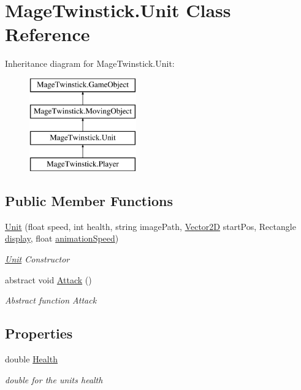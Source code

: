 \hypertarget{class_mage_twinstick_1_1_unit}{}\section{Mage\+Twinstick.\+Unit Class Reference}
\label{class_mage_twinstick_1_1_unit}
Inheritance diagram for Mage\+Twinstick.\+Unit\+:\begin{figure}[H]
\begin{center}
\leavevmode
\includegraphics[height=4.000000cm]{class_mage_twinstick_1_1_unit}
\end{center}
\end{figure}
\subsection*{Public Member Functions}
\begin{DoxyCompactItemize}
\item 
\hyperlink{class_mage_twinstick_1_1_unit_a857d0f6e0f55b4c81e2a3bbf8711dd18}{Unit} (float speed, int health, string image\+Path, \hyperlink{class_mage_twinstick_1_1_vector2_d}{Vector2\+D} start\+Pos, Rectangle \hyperlink{class_mage_twinstick_1_1_game_object_a5807df7f837dc87c8955a008d0b27b50}{display}, float \hyperlink{class_mage_twinstick_1_1_game_object_a5d21c31402c27c5a19f2a62d98720456}{animation\+Speed})
\begin{DoxyCompactList}\small\item\em \hyperlink{class_mage_twinstick_1_1_unit}{Unit} Constructor \end{DoxyCompactList}\item 
abstract void \hyperlink{class_mage_twinstick_1_1_unit_a98b69920e6c6c09c5cfaacbf42a31bbf}{Attack} ()
\begin{DoxyCompactList}\small\item\em Abstract function Attack \end{DoxyCompactList}\end{DoxyCompactItemize}
\subsection*{Properties}
\begin{DoxyCompactItemize}
\item 
double \hyperlink{class_mage_twinstick_1_1_unit_a5c06094e798c41a5d484f6ee00757667}{Health}
\begin{DoxyCompactList}\small\item\em double for the units health \end{DoxyCompactList}\end{DoxyCompactItemize}
